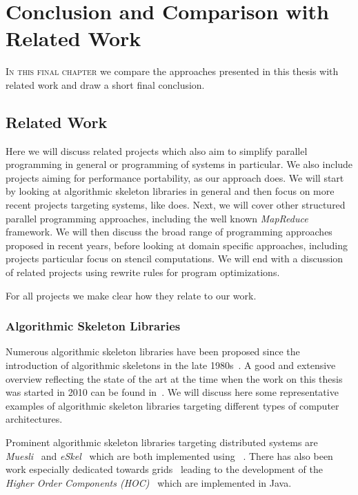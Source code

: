 
\chapter{Conclusion and Comparison with Related Work}

\label{ch:eighth} %

\lettrine[lines=3, loversize=0.1]{I}{n this final chapter} we compare the approaches presented in this thesis with related work and draw a short final conclusion.

\section{Related Work}
Here we will discuss related projects which also aim to simplify parallel programming in general or programming of \GPU systems in particular.
We also include projects aiming for performance portability, as our approach does.
We will start by looking at algorithmic skeleton libraries in general and then focus on more recent projects targeting \GPU systems, like \SkelCL does.
Next, we will cover other structured parallel programming approaches, including the well known \emph{MapReduce} framework.
We will then discuss the broad range of \GPU programming approaches proposed in recent years, before looking at domain specific approaches, including projects particular focus on stencil computations.
We will end with a discussion of related projects using rewrite rules for program optimizations.

For all projects we make clear how they relate to our work.


\subsection{Algorithmic Skeleton Libraries}
Numerous algorithmic skeleton libraries have been proposed since the introduction of algorithmic skeletons in the late 1980s~\cite{Cole1991}.
A good and extensive overview reflecting the state of the art at the time when the work on this thesis was started in 2010 can be found in~\cite{Gonzalez-VelezL10}.
We will discuss here some representative examples of algorithmic skeleton libraries targeting different types of computer architectures.

Prominent algorithmic skeleton libraries targeting distributed systems are \emph{Muesli}~\cite{Kuchen02} and \emph{eSkel}~\cite{Cole04} which are both implemented using \MPI~\cite{MPI}.
There has also been work especially dedicated towards grids~\cite{AltG03a, Alt2007} leading to the development of the \emph{Higher Order Components ({\small HOC})}~\cite{DunnweberG04,DuennweberG09} which are implemented in Java.

